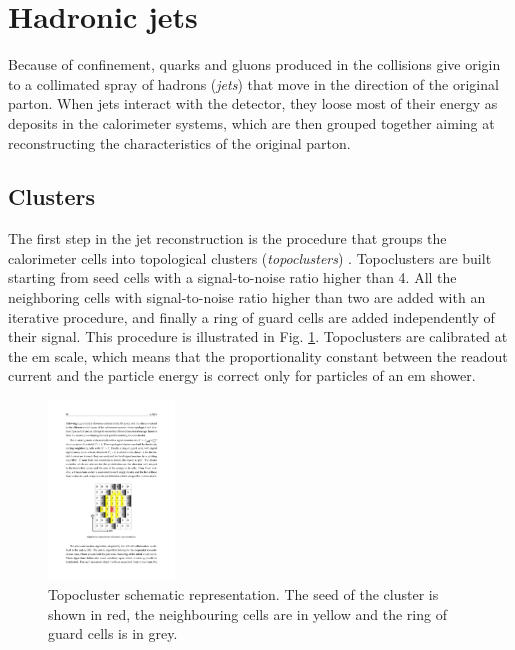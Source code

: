 \section{Hadronic jets}

Because of confinement, quarks and gluons produced in the collisions give origin to a collimated spray of hadrons (\textit{jets}) that move in the direction of the original parton. When jets interact with the detector, they loose most of their energy as deposits in the calorimeter systems, which are then grouped together aiming at reconstructing the characteristics of the original parton. 

\subsection{Clusters}
The first step in the jet reconstruction is the procedure that groups the calorimeter cells into topological clusters (\textit{topoclusters}) \cite{Lampl:2008zz,Aad:2016upy}. Topoclusters are built starting from seed cells with a signal-to-noise ratio higher than 4. All the neighboring cells with signal-to-noise ratio higher than two are added with an iterative procedure, and finally a ring of guard cells are added independently of their signal. This procedure is illustrated in Fig. \ref{fig:obj:topocluster}. Topoclusters are calibrated at the \gls{em} scale, which means that the proportionality constant between the readout current and the particle energy is correct only for particles of an \gls{em} shower.

\begin{figure}[h]
\begin{center}
\includegraphics[width=0.3\textwidth]{./figures/objects/topocluster.pdf}
\end{center}
\caption[Topocluster schematic representation]{Topocluster schematic representation. The seed of the cluster is shown in red, the neighbouring cells are in yellow and the ring of guard cells is in grey.}
\label{fig:obj:topocluster}
\end{figure}
 
